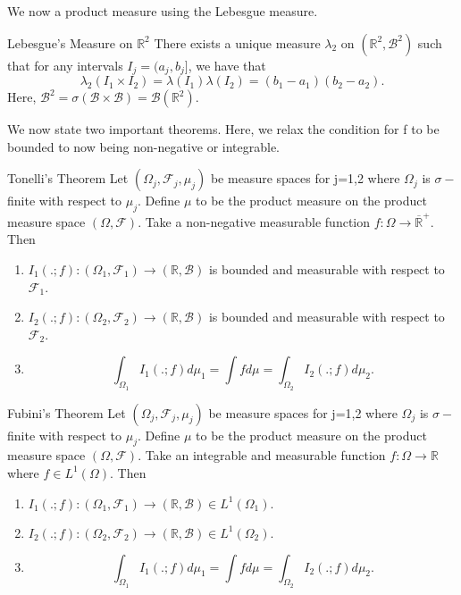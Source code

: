 \documentclass[twoside]{article}
\newcommand{\sigmalgebra}{\mathcal{F}}
\newcommand{\borelsigmaalgebra}{\mathcal{B}}
\newcommand{\real}{\mathbb{R}}
\newcommand{\positiveextendedreal}{\overline{\mathbb{R}}^+}
\begin{document}
We now a product measure using the Lebesgue measure.

\begin{definition_exam}{Lebesgue's Measure on $\mathbb{R}^2$}{} There exists a unique measure $\lambda_2$ on $(\real^2, \borelsigmaalgebra^2)$ such that for any intervals $I_j = (a_j,b_j]$, we have that 
$$
\lambda_2(I_1 \times I_2) = \lambda(I_1)\lambda(I_2) = (b_1 - a_1)(b_2 - a_2).
$$
Here, $\borelsigmaalgebra^2 = \sigma(\borelsigmaalgebra \times \borelsigmaalgebra) = \borelsigmaalgebra(\mathbb{R}^2).$
\end{definition_exam}

We now state two important theorems. Here, we relax the condition for f to be bounded to now being non-negative or integrable.

\begin{theorem_exam}{Tonelli's Theorem}{} Let $(\Omega_j, \sigmalgebra_j, \mu_j)$ be measure spaces for j=1,2 where $\Omega_j$ is $\sigma-$finite with respect to $\mu_j.$ Define $\mu$ to be the product measure on the product measure space $(\Omega, \sigmalgebra)$. Take a non-negative measurable function $f: \Omega \rightarrow \positiveextendedreal$. Then

\begin{enumerate}
\item $I_1(.;f): (\Omega_1, \sigmalgebra_1) \rightarrow (\real, \borelsigmaalgebra)$ is bounded and measurable with respect to $\sigmalgebra_1$.
\item $I_2(.;f): (\Omega_2, \sigmalgebra_2) \rightarrow (\real, \borelsigmaalgebra)$ is bounded and measurable with respect to $\sigmalgebra_2$. 
\item $$
\int_{\Omega_{1}}I_1(.;f)d\mu_1 = \int fd\mu = \int_{\Omega_{2}}I_2(.;f)d\mu_2.
$$

\end{enumerate}
\end{theorem_exam}



\begin{theorem_exam}{Fubini's Theorem}{} Let $(\Omega_j, \sigmalgebra_j, \mu_j)$ be measure spaces for j=1,2 where $\Omega_j$ is $\sigma-$finite with respect to $\mu_j.$ Define $\mu$ to be the product measure on the product measure space $(\Omega, \sigmalgebra)$. Take an integrable and measurable function $f: \Omega \rightarrow \real$ where $f \in L^{1}(\Omega)$. Then

\begin{enumerate}
\item $I_1(.;f): (\Omega_1, \sigmalgebra_1) \rightarrow (\real, \borelsigmaalgebra) \in L^{1}(\Omega_1).$
\item $I_2(.;f): (\Omega_2, \sigmalgebra_2) \rightarrow (\real, \borelsigmaalgebra) \in L^{1}(\Omega_2).$ 
\item $$
\int_{\Omega_{1}}I_1(.;f)d\mu_1 = \int fd\mu = \int_{\Omega_{2}}I_2(.;f)d\mu_2.
$$

\end{enumerate}
\end{theorem_exam}
\end{document}
